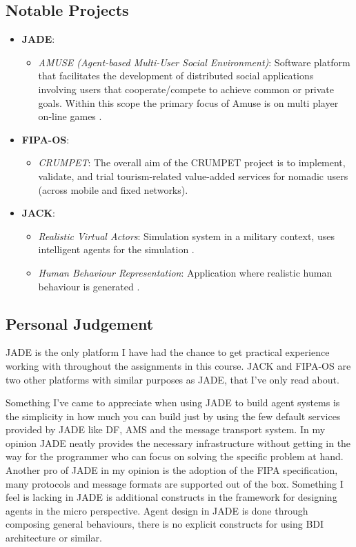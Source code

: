 \documentclass[paper=letter, fontsize=12pt]{article}
\begin{document}
\subsection{Notable Projects}
\begin{itemize}
\item \textbf{JADE}: \\
\begin{itemize}
\item \textit{AMUSE (Agent-based Multi-User Social Environment)}: Software platform that facilitates the development of distributed social applications involving users that cooperate/compete to achieve common or private goals. Within this scope the primary focus of Amuse is on multi player on-line games \citep{jade-3}.
\end{itemize}
\item \textbf{FIPA-OS}: \\
\begin{itemize}
\item \textit{CRUMPET}: The overall aim of the CRUMPET project is to implement, validate, and trial tourism-related value-added services for nomadic users (across mobile and fixed networks). \citep{fipa-os-3}
\end{itemize}
\item \textbf{JACK}: \\
\begin{itemize}
\item \textit{Realistic Virtual Actors}: Simulation system in a military context, uses intelligent agents for the simulation \citep{jack-3}.
\item \textit{Human Behaviour Representation}: Application where realistic human behaviour is generated \citep{jack-3}.
\end{itemize}
\end{itemize}
\subsection{Personal Judgement}
JADE is the only platform I have had the chance to get practical experience working with throughout the assignments in this course. JACK and FIPA-OS are two other platforms with similar purposes as JADE, that I've only read about. 

Something I've came to appreciate when using JADE to build agent systems is the simplicity in how much you can build just by using the few default services provided by JADE like DF, AMS and the message transport system. In my opinion JADE neatly provides the necessary infrastructure without getting in the way for the programmer who can focus on solving the specific problem at hand. Another pro of JADE in my opinion is the adoption of the FIPA specification, many protocols and message formats are supported out of the box. Something I feel is lacking in JADE is additional constructs in the framework for designing agents in the micro perspective. Agent design in JADE is done through composing general behaviours, there is no explicit constructs for using BDI architecture or similar. 
\end{document}
